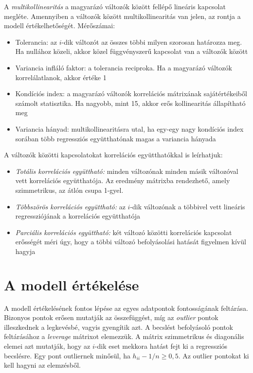 A \emph{multikollinearitás} a magyarázó változók között fellépő lineáris kapcsolat megléte. Amennyiben a változók között multikollinearitás van jelen, az rontja a modell értékelhetőségét. Mérőszámai:
\begin{itemize}
\item Tolerancia: az $i$-dik változót az összes többi milyen szorosan határozza meg. Ha nullához közeli, akkor közel függvényszerű kapcsolat van a változók között
\item Variancia infláló faktor: a tolerancia reciproka. Ha a magyarázó változók korrelálatlanok, akkor értéke 1
\item Kondíciós index: a magyarázó változók korrelációs mátrixának sajátértékeiből számolt statisztika. Ha nagyobb, mint 15, akkor erős kollinearitás állapítható meg
\item Variancia hányad: multikollinearitásra utal, ha egy-egy nagy kondíciós index sorában több regressziós együtthatónak magas a variancia hányada
\end{itemize}

A változók közötti kapcsolatokat korrelációs együtthatókkal is leírhatjuk:
\begin{itemize}
\item \emph{Totális korrelációs együttható:} minden változónak minden másik változóval vett korrelációs együtthatója. Az eredmény mátrixba rendezhető, amely szimmetrikus, az átlón csupa 1-gyel.
\item \emph{Többszörös korrelációs együttható:} az $i$-dik változónak a többivel vett lineáris regressziójának a korrelációs együtthatója
\item \emph{Parciális korrelációs együttható:} két változó közötti korrelációs kapcsolat erősségét méri úgy, hogy a többi változó befolyásolási hatását figyelmen kívül hagyja
\end{itemize}

\section{A modell értékelése}

A modell értékelésének fontos lépése az egyes adatpontok fontosságának feltárása. Bizonyos pontok erősen mutatják az összefüggést, míg az \emph{outlier} pontok illeszkednek a legkevésbé, vagyis gyengítik azt. A becslést befolyásoló pontok feltárásához a \emph{leverage} mátrixot elemezzük. A mátrix szimmetrikus és diagonális elemei azt mutatják, hogy az $i$-dik eset mekkora hatást fejt ki a regressziós becslésre. Egy pont outliernek minősül, ha $h_{ii}-1/n \geq 0,5$. Az outlier pontokat ki kell hagyni az elemzésből.

